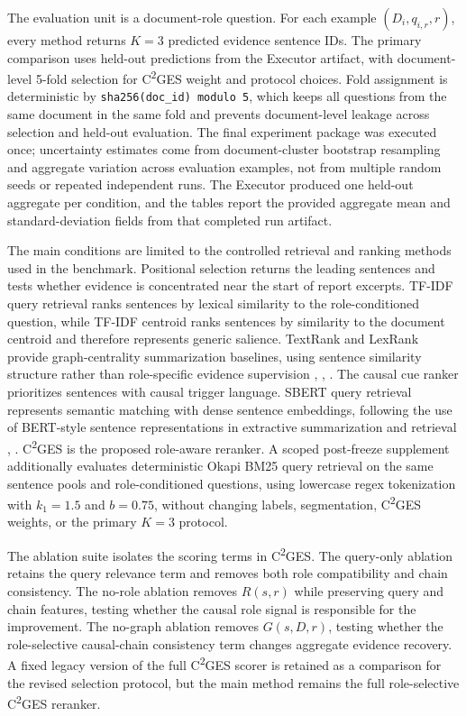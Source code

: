 \documentclass{ieeeaccess}
\begin{document}
The evaluation unit is a document-role question. For each example \((D_i,q_{i,r},r)\), every method returns \(K=3\) predicted evidence sentence IDs. The primary comparison uses held-out predictions from the Executor artifact, with document-level 5-fold selection for C\textsuperscript{2}GES weight and protocol choices. Fold assignment is deterministic by \texttt{sha256(doc\_id) modulo 5}, which keeps all questions from the same document in the same fold and prevents document-level leakage across selection and held-out evaluation. The final experiment package was executed once; uncertainty estimates come from document-cluster bootstrap resampling and aggregate variation across evaluation examples, not from multiple random seeds or repeated independent runs. The Executor produced one held-out aggregate per condition, and the tables report the provided aggregate mean and standard-deviation fields from that completed run artifact.

The main conditions are limited to the controlled retrieval and ranking methods used in the benchmark. Positional selection returns the leading sentences and tests whether evidence is concentrated near the start of report excerpts. TF-IDF query retrieval ranks sentences by lexical similarity to the role-conditioned question, while TF-IDF centroid ranks sentences by similarity to the document centroid and therefore represents generic salience. TextRank and LexRank provide graph-centrality summarization baselines, using sentence similarity structure rather than role-specific evidence supervision \cite{khor2021text}, \cite{belwal2020graphbased}, \cite{setiawan2025impact}. The causal cue ranker prioritizes sentences with causal trigger language. SBERT query retrieval represents semantic matching with dense sentence embeddings, following the use of BERT-style sentence representations in extractive summarization and retrieval \cite{abdelsalam2022performance}, \cite{feng2022languageagnostic}. C\textsuperscript{2}GES is the proposed role-aware reranker. A scoped post-freeze supplement additionally evaluates deterministic Okapi BM25 query retrieval on the same sentence pools and role-conditioned questions, using lowercase regex tokenization with \(k_1=1.5\) and \(b=0.75\), without changing labels, segmentation, C\textsuperscript{2}GES weights, or the primary \(K=3\) protocol.

The ablation suite isolates the scoring terms in C\textsuperscript{2}GES. The query-only ablation retains the query relevance term and removes both role compatibility and chain consistency. The no-role ablation removes \(R(s,r)\) while preserving query and chain features, testing whether the causal role signal is responsible for the improvement. The no-graph ablation removes \(G(s,D,r)\), testing whether the role-selective causal-chain consistency term changes aggregate evidence recovery. A fixed legacy version of the full C\textsuperscript{2}GES scorer is retained as a comparison for the revised selection protocol, but the main method remains the full role-selective C\textsuperscript{2}GES reranker.
\end{document}

